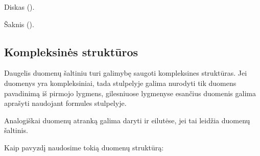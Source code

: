 \documentclass[letterpaper,10pt,lithuanian]{sphinxmanual}
\begin{document}
\begin{fulllineitems}
\begin{fulllineitems}
\begin{description}
\sphinxAtStartPar
Diskas ().

\sphinxAtStartPar
Šaknis ().

\end{description}

\end{fulllineitems}


\end{fulllineitems}



\subsection{Kompleksinės struktūros}
\label{\detokenize{formules:kompleksines-strukturos}}\label{\detokenize{formules:id12}}
\sphinxAtStartPar
Daugelis duomenų šaltiniu turi galimybę saugoti kompleksines struktūras. Jei
duomenys yra kompleksiniai, tada {\hyperref[\detokenize{dimensijos:property.source}]{}} stulpelyje galima
nurodyti tik duomens pavadinimą iš pirmojo lygmens, gilesniuose lygmenyse
esančius duomenis galima aprašyti naudojant formules {\hyperref[\detokenize{dimensijos:property.prepare}]{}}
stulpelyje.

\sphinxAtStartPar
Analogiškai duomenų atranką galima daryti ir  eilutėse, jei tai leidžia
duomenų šaltinis.

\sphinxAtStartPar
Kaip pavyzdį naudosime tokią {\hyperref[\detokenize{savokos:term-JSON}]{}} duomenų struktūrą:

\begin{sphinxVerbatim}[commandchars=\\\{\}]
\PYG{p}{[}
\PYG{p}{[}\PYG{p}{]}
\PYG{p}{]}
\end{sphinxVerbatim}
\end{document}
